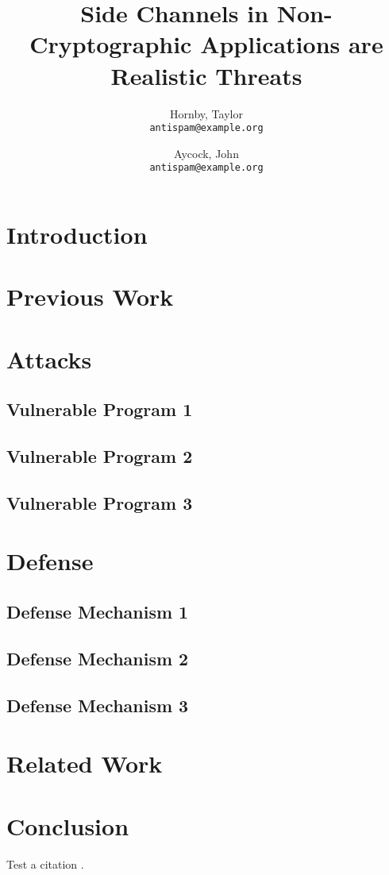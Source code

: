 \documentclass[letterpaper,10pt]{article} %
\title{Side Channels in Non-Cryptographic Applications are Realistic Threats}
\author{Hornby, Taylor\\
    \texttt{antispam@example.org}
    \and
    Aycock, John\\
    \texttt{antispam@example.org}
}
\begin{document}
\maketitle

\begin{abstract}
\end{abstract}

\section{Introduction}

\section{Previous Work}

\section{Attacks}

\subsection{Vulnerable Program 1}
\subsection{Vulnerable Program 2}
\subsection{Vulnerable Program 3}

\section{Defense}

\subsection{Defense Mechanism 1}
\subsection{Defense Mechanism 2}
\subsection{Defense Mechanism 3}

\section{Related Work}

\section{Conclusion}

Test a citation \citep{Pappas2012SmashingGadgets}.



\end{document}
